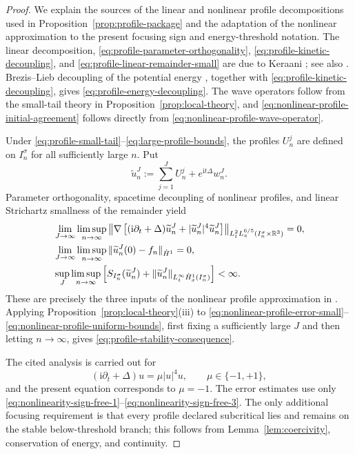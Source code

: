 \documentclass{interact}
\numberwithin{equation}{section}
\theoremstyle{plain}
\theoremstyle{definition}
\theoremstyle{remark}
\newcommand{\R}{\mathbb R}
\newcommand{\ii}{\mathrm i}
\begin{document}
\begin{proof}
We explain the sources of the linear and nonlinear profile decompositions used in Proposition~\ref{prop:profile-package} and the adaptation of the nonlinear approximation to the present focusing sign and energy-threshold notation. The linear decomposition, \eqref{eq:profile-parameter-orthogonality}, \eqref{eq:profile-kinetic-decoupling}, and \eqref{eq:profile-linear-remainder-small} are due to Keraani \cite{Keraani2001}; see also \cite[Theorem~4.27]{KillipVisan2013}. Brezis--Lieb decoupling of the potential energy \cite{BrezisLieb1983}, together with \eqref{eq:profile-kinetic-decoupling}, gives \eqref{eq:profile-energy-decoupling}. The wave operators follow from the small-tail theory in Proposition~\ref{prop:local-theory}, and \eqref{eq:nonlinear-profile-initial-agreement} follows directly from \eqref{eq:nonlinear-profile-wave-operator}.

Under \eqref{eq:profile-small-tail}--\eqref{eq:large-profile-bounds}, the profiles $U_n^j$ are defined on $I_n^\sigma$ for all sufficiently large $n$. Put
\[
 \widetilde u_n^J
 :=\sum_{j=1}^J U_n^j+e^{\ii t\Delta}w_n^J.
\]
Parameter orthogonality, spacetime decoupling of nonlinear profiles, and linear Strichartz smallness of the remainder yield
\begin{align}
 &\lim_{J\to\infty}\limsup_{n\to\infty}
 \left\|\nabla\left[
 (\ii\partial_t+\Delta)\widetilde u_n^J
 +|\widetilde u_n^J|^4\widetilde u_n^J
 \right]\right\|_{L_t^2L_x^{6/5}(I_n^\sigma\times\R^3)}=0,
 \label{eq:nonlinear-profile-error-small}\\
 &\lim_{J\to\infty}\limsup_{n\to\infty}
 \|\widetilde u_n^J(0)-f_n\|_{\dot H^1}=0,\notag\\
 &\sup_J\limsup_{n\to\infty}
 \left[
 S_{I_n^\sigma}(\widetilde u_n^J)
 +\|\widetilde u_n^J\|_{L_t^\infty\dot H_x^1(I_n^\sigma)}
 \right]<\infty.
 \label{eq:nonlinear-profile-uniform-bounds}
\end{align}
These are precisely the three inputs of the nonlinear profile approximation in \cite[Lemmas~5.7--5.10 and the proof of Proposition~5.6]{KillipVisan2013}. Applying Proposition~\ref{prop:local-theory}(iii) to \eqref{eq:nonlinear-profile-error-small}--\eqref{eq:nonlinear-profile-uniform-bounds}, first fixing a sufficiently large $J$ and then letting $n\to\infty$, gives \eqref{eq:profile-stability-consequence}.

The cited analysis is carried out for
\[
 (\ii\partial_t+\Delta)u=\mu|u|^4u,
 \qquad \mu\in\{-1,+1\},
\]
and the present equation corresponds to $\mu=-1$. The error estimates use only \eqref{eq:nonlinearity-sign-free-1}--\eqref{eq:nonlinearity-sign-free-3}. The only additional focusing requirement is that every profile declared subcritical lies and remains on the stable below-threshold branch; this follows from Lemma~\ref{lem:coercivity}, conservation of energy, and continuity.
\end{proof}
\end{document}
